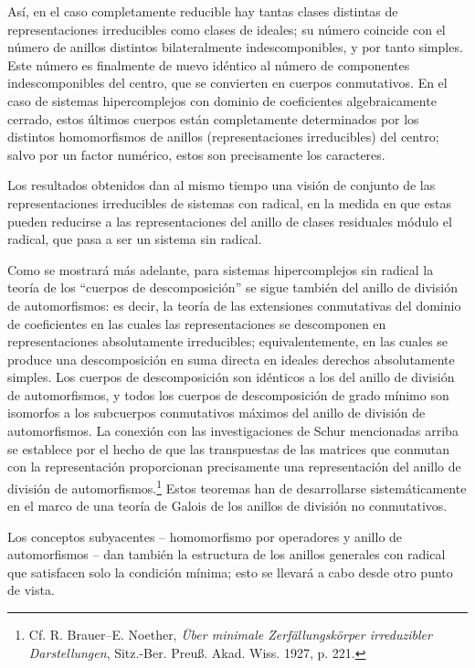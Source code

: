 \documentclass[11pt]{article}
\begin{document}
Así, en el caso completamente reducible hay tantas clases distintas de representaciones irreducibles como clases de ideales; su número coincide con el número de anillos distintos bilateralmente indescomponibles, y por tanto simples. Este número es finalmente de nuevo idéntico al número de componentes indescomponibles del centro, que se convierten en cuerpos conmutativos. En el caso de sistemas hipercomplejos con dominio de coeficientes algebraicamente cerrado, estos últimos cuerpos están completamente determinados por los distintos homomorfismos de anillos (representaciones irreducibles) del centro; salvo por un factor numérico, estos son precisamente los caracteres.

Los resultados obtenidos dan al mismo tiempo una visión de conjunto de las representaciones irreducibles de sistemas con radical, en la medida en que estas pueden reducirse a las representaciones del anillo de clases residuales módulo el radical, que pasa a ser un sistema sin radical.

Como se mostrará más adelante, para sistemas hipercomplejos sin radical la teoría de los ``cuerpos de descomposición'' se sigue también del anillo de división de automorfismos: es decir, la teoría de las extensiones conmutativas del dominio de coeficientes en las cuales las representaciones se descomponen en representaciones absolutamente irreducibles; equivalentemente, en las cuales se produce una descomposición en suma directa en ideales derechos absolutamente simples. Los cuerpos de descomposición son idénticos a los del anillo de división de automorfismos, y todos los cuerpos de descomposición de grado mínimo son isomorfos a los subcuerpos conmutativos máximos del anillo de división de automorfismos. La conexión con las investigaciones de Schur mencionadas arriba se establece por el hecho de que las transpuestas de las matrices que conmutan con la representación proporcionan precisamente una representación del anillo de división de automorfismos.\footnote{Cf. R. Brauer--E. Noether, \emph{Über minimale Zerfällungskörper irreduzibler Darstellungen}, Sitz.-Ber. Preuß. Akad. Wiss. 1927, p. 221.} Estos teoremas han de desarrollarse sistemáticamente en el marco de una teoría de Galois de los anillos de división no conmutativos.

Los conceptos subyacentes -- homomorfismo por operadores y anillo de automorfismos -- dan también la estructura de los anillos generales con radical que satisfacen solo la condición mínima; esto se llevará a cabo desde otro punto de vista.
\end{document}
